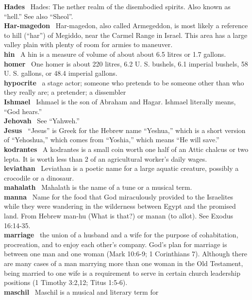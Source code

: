 \textbf{Hades}~ Hades: The nether realm of the disembodied spirits. Also
known as ``hell.'' See also ``Sheol''.\\
\textbf{Har-magedon}~ Har-magedon, also called Armegeddon, is most
likely a reference to hill (``har'') of Megiddo, near the Carmel Range
in Israel. This area has a large valley plain with plenty of room for
armies to maneuver.\\
\textbf{hin}~ A hin is a measure of volume of about about 6.5 litres or
1.7 gallons.\\
\textbf{homer}~ One homer is about 220 litres, 6.2 U. S. bushels, 6.1
imperial bushels, 58 U. S. gallons, or 48.4 imperial gallons.\\
\textbf{hypocrite}~ a stage actor; someone who pretends to be someone
other than who they really are; a pretender; a dissembler\\
\textbf{Ishmael}~ Ishmael is the son of Abraham and Hagar. Ishmael
literally means, ``God hears.''\\
\textbf{Jehovah}~ See ``Yahweh.''\\
\textbf{Jesus}~ ``Jesus'' is Greek for the Hebrew name ``Yeshua,'' which
is a short version of ``Yehoshua,'' which comes from ``Yoshia,'' which
means ``He will save.''\\
\textbf{kodrantes}~ A kodrantes is a small coin worth one half of an
Attic chalcus or two lepta. It is worth less than 2 of an agricultural
worker's daily wages.\\
\textbf{leviathan}~ Leviathan is a poetic name for a large aquatic
creature, possibly a crocodile or a dinosaur.\\
\textbf{mahalath}~ Mahalath is the name of a tune or a musical term.\\
\textbf{manna}~ Name for the food that God miraculously provided to the
Israelites while they were wandering in the wilderness between Egypt and
the promised land. From Hebrew man-hu (What is that?) or manan (to
allot). See Exodus 16:14-35.\\
\textbf{marriage}~ the union of a husband and a wife for the purpose of
cohabitation, procreation, and to enjoy each other's company. God's plan
for marriage is between one man and one woman (Mark 10:6-9; 1
Corinthians 7). Although there are many cases of a man marrying more
than one woman in the Old Testament, being married to one wife is a
requirement to serve in certain church leadership positions (1 Timothy
3:2,12; Titus 1:5-6).\\
\textbf{maschil}~ Maschil is a musical and literary term for
